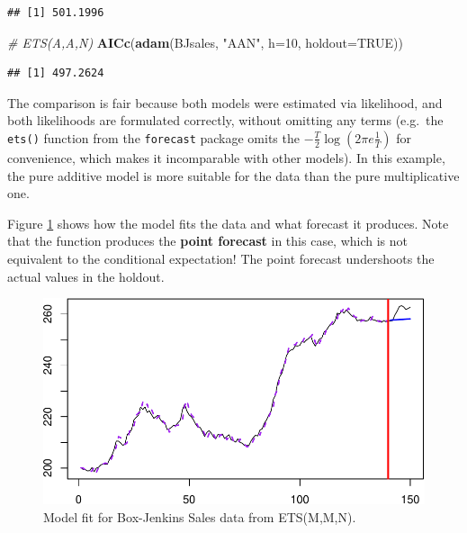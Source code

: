 \documentclass[]{book}
\newenvironment{Shaded}{\begin{snugshade}}{\end{snugshade}}
\newcommand{\CommentTok}[1]{\textcolor[rgb]{0.56,0.35,0.01}{\textit{#1}}}
\newcommand{\DataTypeTok}[1]{\textcolor[rgb]{0.13,0.29,0.53}{#1}}
\newcommand{\DecValTok}[1]{\textcolor[rgb]{0.00,0.00,0.81}{#1}}
\newcommand{\KeywordTok}[1]{\textcolor[rgb]{0.13,0.29,0.53}{\textbf{#1}}}
\newcommand{\NormalTok}[1]{#1}
\newcommand{\OtherTok}[1]{\textcolor[rgb]{0.56,0.35,0.01}{#1}}
\newcommand{\StringTok}[1]{\textcolor[rgb]{0.31,0.60,0.02}{#1}}
\theoremstyle{definition}
\theoremstyle{definition}
\theoremstyle{definition}
\theoremstyle{definition}
\theoremstyle{remark}
\begin{document}
\begin{verbatim}
## [1] 501.1996
\end{verbatim}

\begin{Shaded}
\begin{Highlighting}[]
\CommentTok{# ETS(A,A,N)}
\KeywordTok{AICc}\NormalTok{(}\KeywordTok{adam}\NormalTok{(BJsales, }\StringTok{"AAN"}\NormalTok{, }\DataTypeTok{h=}\DecValTok{10}\NormalTok{, }\DataTypeTok{holdout=}\OtherTok{TRUE}\NormalTok{))}
\end{Highlighting}
\end{Shaded}

\begin{verbatim}
## [1] 497.2624
\end{verbatim}

The comparison is fair because both models were estimated via likelihood, and both likelihoods are formulated correctly, without omitting any terms (e.g.~the \texttt{ets()} function from the \texttt{forecast} package omits the \(-\frac{T}{2} \log\left(2\pi e \frac{1}{T}\right)\) for convenience, which makes it incomparable with other models). In this example, the pure additive model is more suitable for the data than the pure multiplicative one.

Figure \ref{fig:BJSalesadamETSMMN} shows how the model fits the data and what forecast it produces. Note that the function produces the \textbf{point forecast} in this case, which is not equivalent to the conditional expectation! The point forecast undershoots the actual values in the holdout.

\begin{figure}
\centering
\includegraphics{Svetunkov--2022----ADAM_files/figure-latex/BJSalesadamETSMMN-1.pdf}
\caption{\label{fig:BJSalesadamETSMMN}Model fit for Box-Jenkins Sales data from ETS(M,M,N).}
\end{figure}
\end{document}
